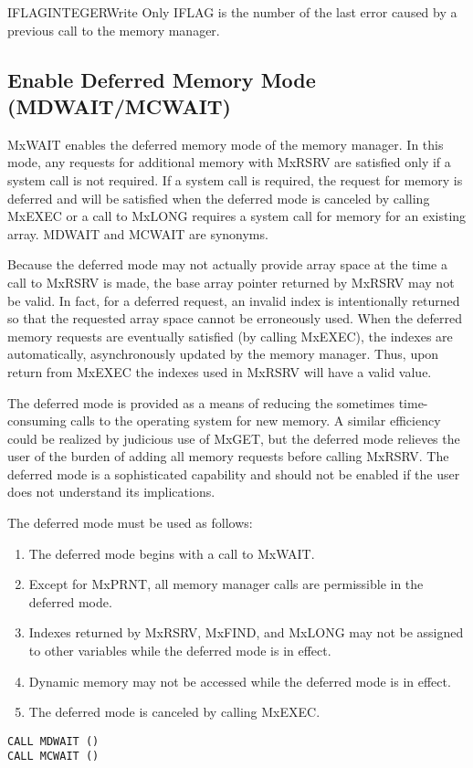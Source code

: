 \begin{argy}{IFLAG}{INTEGER}{Write Only}
IFLAG is the number of the last error caused by a previous call to the
memory manager.
\end{argy}

\subsection{Enable Deferred Memory Mode (MDWAIT/MCWAIT)} \label{sec:wait}
MxWAIT enables the deferred memory mode of the memory manager. In
this mode, any requests for additional memory with MxRSRV are
satisfied only if a system call is not required. If a system call is
required, the request for memory is deferred and will be satisfied when the
deferred mode is canceled by calling MxEXEC or a call to
MxLONG requires a system call for memory for an existing array.
MDWAIT and MCWAIT are synonyms.

Because the deferred mode may not actually provide array space at the time a
call to MxRSRV is made, the base array pointer re\-turn\-ed by
MxRSRV may not be valid. In fact, for a deferred request, an invalid
index is intentionally returned so that the requested array space cannot
be erroneously used. When the deferred memory requests are eventually
satisfied (by calling MxEXEC), the indexes are automatically,
asynchronously updated by the memory manager. Thus, upon return from
MxEXEC the indexes used in MxRSRV will have a valid value.

The deferred mode is provided as a means of reducing the sometimes
time-consuming calls to the operating system for new memory. A similar
efficiency could be realized by judicious use of MxGET, but the
deferred mode relieves the user of the burden of adding all memory requests
before calling MxRSRV. The deferred mode is a sophisticated
capability and should not be enabled if the user does not understand its
implications.

The deferred mode must be used as follows:
\begin{enumerate}
\item The deferred mode begins with a call to MxWAIT.
\item Except for MxPRNT, all memory manager calls are permissible
in the deferred mode.
\item Indexes returned by MxRSRV, MxFIND, and MxLONG
may not be assigned to other variables while the deferred mode is
in effect.
\item Dynamic memory may not be accessed while the deferred mode is in
effect.
\item The deferred mode is canceled by calling MxEXEC.
\end{enumerate}
\begin{verbatim}
CALL MDWAIT ()
CALL MCWAIT ()
\end{verbatim}

